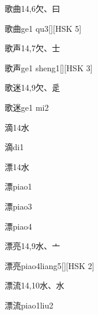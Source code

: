 \begin{entry}{歌曲}{14,6}{⽋、⽈}
  \begin{phonetics}{歌曲}{ge1 qu3}[][HSK 5]
  \end{phonetics}
\end{entry}

\begin{entry}{歌声}{14,7}{⽋、⼠}
  \begin{phonetics}{歌声}{ge1 sheng1}[][HSK 3]
  \end{phonetics}
\end{entry}

\begin{entry}{歌迷}{14,9}{⽋、⾡}
  \begin{phonetics}{歌迷}{ge1 mi2}
  \end{phonetics}
\end{entry}

\begin{entry}{滴}{14}{⽔}
  \begin{phonetics}{滴}{di1}
  \end{phonetics}
\end{entry}

\begin{entry}{漂}{14}{⽔}
  \begin{phonetics}{漂}{piao1}
  \end{phonetics}
  \begin{phonetics}{漂}{piao3}
  \end{phonetics}
  \begin{phonetics}{漂}{piao4}
  \end{phonetics}
\end{entry}

\begin{entry}{漂亮}{14,9}{⽔、⼇}
  \begin{phonetics}{漂亮}{piao4liang5}[][HSK 2]
  \end{phonetics}
\end{entry}

\begin{entry}{漂流}{14,10}{⽔、⽔}
  \begin{phonetics}{漂流}{piao1liu2}
  \end{phonetics}
\end{entry}

